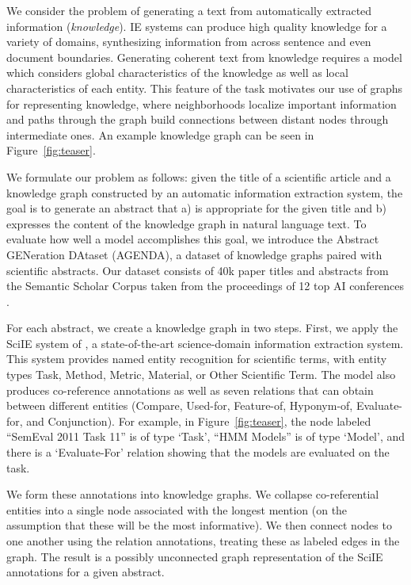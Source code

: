 \documentclass[11pt,a4paper]{article}
\begin{document}
We consider the problem of generating a text from automatically extracted information ({\it knowledge}). 
IE systems can produce high quality knowledge for a variety of domains, synthesizing information from across sentence and even document boundaries. 
Generating coherent text from knowledge requires a model which considers global characteristics of the knowledge as well as local characteristics of each entity. 
This feature of the task motivates our use of graphs for representing knowledge, where neighborhoods localize important information and paths through the graph build connections between distant nodes through intermediate ones.
An example knowledge graph can be seen in Figure~\ref{fig:teaser}.

We formulate our problem as follows: given the title of a scientific article and a knowledge graph constructed by an automatic information extraction system, the goal is to generate an abstract that a) is appropriate for the given title and b) expresses the content of the knowledge graph in natural language text. 
To evaluate how well a model accomplishes this goal, we introduce the Abstract GENeration DAtaset (AGENDA), a dataset of knowledge graphs paired with scientific abstracts.
Our dataset consists of 40k paper titles and abstracts from the Semantic Scholar Corpus taken from the proceedings of 12 top AI conferences \cite{ammar:18}. 

For each abstract, we create a knowledge graph in two steps. 
First, we apply the SciIE system of \citet{luan2018multi}, a state-of-the-art science-domain information extraction system. 
This system provides named entity recognition for scientific terms, with entity types Task, Method, Metric, Material, or Other Scientific Term. 
The model also produces co-reference annotations as well as seven relations that can obtain between different entities (Compare, Used-for, Feature-of, Hyponym-of, Evaluate-for, and Conjunction).
For example, in Figure~\ref{fig:teaser}, the node labeled ``SemEval 2011 Task 11'' is of type `Task', ``HMM Models'' is of type `Model', and there is a `Evaluate-For' relation showing that the models are evaluated on the task. 

We form these annotations into knowledge graphs. 
We collapse co-referential entities into a single node associated with the longest mention (on the assumption that these will be the most informative). 
We then connect nodes to one another using the relation annotations, treating these as labeled edges in the graph. 
The result is a possibly unconnected graph representation of the SciIE annotations for a given abstract.
\end{document}
